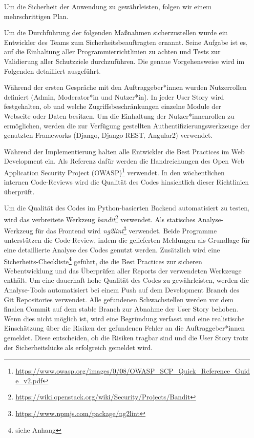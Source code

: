 \documentclass[accentcolor=tud0b,12pt,paper=a4]{tudreport}
\begin{document}
Um die Sicherheit der Anwendung zu gewährleisten, folgen wir einem mehrschrittigen Plan.

Um die Durchführung der folgenden Maßnahmen sicherzustellen wurde ein Entwickler des Teams zum Sicherheitsbeauftragten ernannt. Seine Aufgabe ist es, auf die Einhaltung aller Programmierrichtlinien zu achten und Tests zur Validierung aller Schutzziele durchzuführen. Die genaue Vorgehensweise wird im Folgenden detailliert ausgeführt.

Während der ersten Gespräche mit den Auftraggeber*innen wurden Nutzerrollen definiert (Admin, Moderator*in und Nutzer*in). In jeder User Story wird festgehalten, ob und welche Zugriffsbeschränkungen einzelne Module der Webseite oder Daten besitzen. Um die Einhaltung der Nutzer*innenrollen zu ermöglichen, werden die zur Verfügung gestellten Authentifizierungswerkzeuge der genutzten Frameworks (Django, Django REST, Angular2) verwendet. %

Während der Implementierung halten alle Entwickler die Best Practices im Web Development ein. Als Referenz dafür werden die Handreichungen des Open Web Application Security Project (OWASP)\footnote{\href{https://www.owasp.org/images/0/08/OWASP_SCP_Quick_Reference_Guide_v2.pdf}{https://www.owasp.org/images/0/08/OWASP\_SCP\_Quick\_Reference\_Guide\_v2.pdf}} verwendet. In den wöchentlichen internen Code-Reviews wird die Qualität des Codes hinsichtlich dieser Richtlinien überprüft.

Um die Qualität des Codes im Python-basierten Backend automatisiert zu testen, wird das verbreitete Werkzeug \emph{bandit}\footnote{\href{https://wiki.openstack.org/wiki/Security/Projects/Bandit}{https://wiki.openstack.org/wiki/Security/Projects/Bandit}} verwendet. Als statisches Analyse-Werkzeug für das Frontend wird \emph{ng2lint}\footnote{\href{https://www.npmjs.com/package/ng2lint}{https://www.npmjs.com/package/ng2lint}} verwendet. Beide Programme unterstützen die Code-Review, indem die gelieferten Meldungen als Grundlage für eine detaillierte Analyse des Codes genutzt werden. Zusätzlich wird eine Sicherheits-Checkliste\footnote{siehe Anhang} geführt, die die Best Practices zur sicheren Webentwicklung und das Überprüfen aller Reports der verwendeten Werkzeuge enthält. Um eine dauerhaft hohe Qualität des Codes zu gewährleisten, werden die Analyse-Tools automatisiert bei einem Push auf dem Development Branch des Git Repositories verwendet. Alle gefundenen Schwachstellen werden vor dem finalen Commit auf dem stable Branch zur Abnahme der User Story behoben. Wenn dies nicht möglich ist, wird eine Begründung verfasst und eine realistische Einschätzung über die Risiken der gefundenen Fehler an die Auftraggeber*innen gemeldet. Diese entscheiden, ob die Risiken tragbar sind und die User Story trotz der Sicherheitslücke als erfolgreich gemeldet wird.
\end{document}
